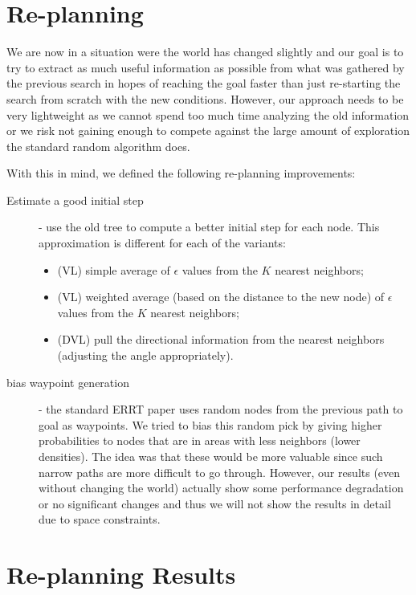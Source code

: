 \documentclass[10pt,twoside,twocolumn]{article}
\begin{document}
\section{Re-planning}

We are now in a situation were the world has changed slightly and our goal is to try to extract as much useful information as possible from what was gathered by the previous search in hopes of reaching the goal faster than just re-starting the search from scratch with the new conditions. However, our approach needs to be very lightweight as we cannot spend too much time analyzing the old information or we risk not gaining enough to compete against the large amount of exploration the standard random algorithm does.

With this in mind, we defined the following re-planning improvements:

\begin{description}
\item[Estimate a good initial step] - use the old tree to compute a better initial step for each node. This approximation is different for each of the variants:
\begin{itemize}
\item (VL) simple average of $\epsilon$ values from the $K$ nearest neighbors;
\item (VL) weighted average (based on the distance to the new node) of $\epsilon$ values from the $K$ nearest neighbors; 
\item (DVL) pull the directional information from the nearest neighbors (adjusting the angle appropriately).
\end{itemize}

\item[bias waypoint generation] - the standard ERRT paper uses random nodes from the previous path to goal as waypoints. We tried to bias this random pick by giving higher probabilities to nodes that are in areas with less neighbors (lower densities). The idea was that these would be more valuable since such narrow paths are more difficult to go through. However, our results (even without changing the world) actually show some performance degradation or no significant changes and thus we will not show the results in detail due to space constraints.
\end{description}

\section{Re-planning Results}
\end{document}
